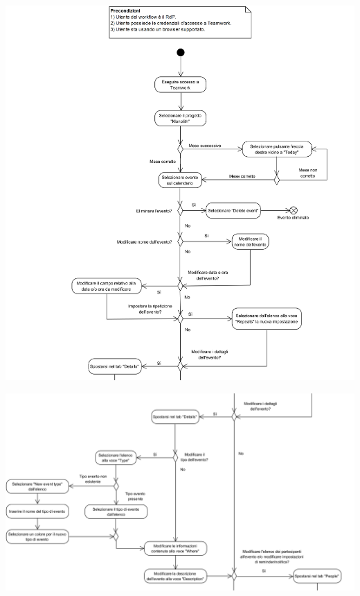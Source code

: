 \begin{samepage}
	\mbox{}\\
	
	\begin{center}
		\includegraphics[width=15cm]{../../documenti/NormeDiProgetto/DiagrammiProcedure/EditEventi1.png}
	\end{center}
	
\end{samepage}

\begin{center}
	\includegraphics[width=15cm]{./DiagrammiProcedure/EditEventi2.png}
\end{center}

